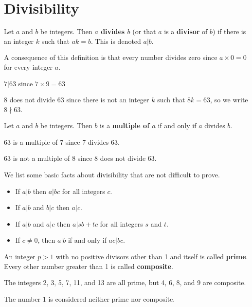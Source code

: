 \section{Divisibility}
\begin{definition}
    Let $a$ and $b$ be integers. Then \textbf{$a$ divides $b$} (or that $a$ is a \textbf{divisor} of $b$) if there is an integer $k$ such that $ak = b$. This is denoted $a\vert b$.
\end{definition}
\begin{remark}
    A consequence of this definition is that every number divides zero since $a \times 0 = 0$ for every integer $a$.
\end{remark}
\begin{example}
    $7\vert 63$ since $7 \times 9 = 63$
\end{example}
\begin{example}
    8 does not divide 63 since there is not an integer $k$ such that $8k = 63$, so we write $8 \nmid 63$.
\end{example}

\begin{definition}
    Let $a$ and $b$ be integers. Then $b$ is a \textbf{multiple of $a$} if and only if $a$ divides $b$.
\end{definition}
\begin{example}
    63 is a multiple of 7 since 7 divides 63.
\end{example}
\begin{example}
    63 is not a multiple of 8 since 8 does not divide 63.
\end{example}

We list some basic facts about divisibility that are not difficult to prove.
\begin{itemize}
    \item If $a\vert b$ then $a\vert bc$ for all integers $c$.
    \item If $a\vert b$ and $b\vert c$ then $a\vert c$.
    \item If $a\vert b$ and $a\vert c$ then $a\vert sb+tc$ for all integers $s$ and $t$.
    \item If $c \neq 0$, then $a\vert b$ if and only if $ac\vert bc$.
\end{itemize}

\begin{definition}
    An integer $p > 1$ with no positive divisors other than 1 and itself is called \textbf{prime}. Every other number greater than 1 is called \textbf{composite}.
\end{definition}
\begin{example}
    The integers 2, 3, 5, 7, 11, and 13 are all prime, but 4, 6, 8, and 9 are composite.
\end{example}
\begin{remark}
    The number 1 is considered neither prime nor composite.
\end{remark}

